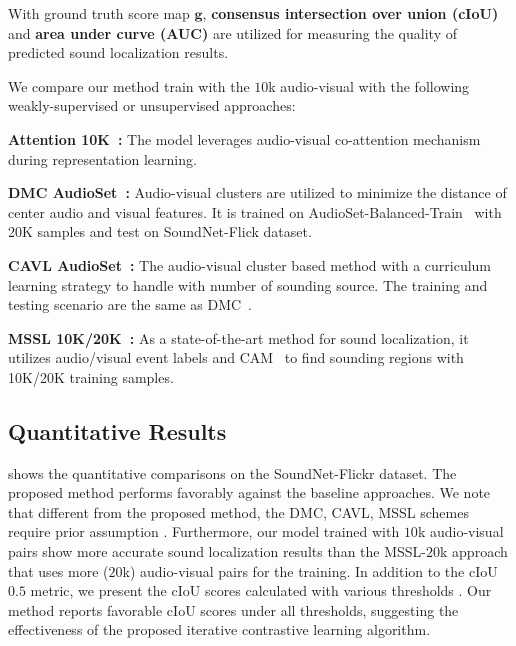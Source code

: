 With ground truth score map $\mathbf{g}$, 
\textbf{consensus intersection over union (cIoU)} and \textbf{area under curve (AUC)} are utilized for measuring the quality of predicted sound localization results. 

We compare our method train with the $10$k audio-visual with the following weakly-supervised or unsupervised approaches: 
\begin{compactitem}
\item\textbf{Attention 10K~\cite{av_cvpr18_lls,av_tpami20_lls}:} The model leverages audio-visual co-attention mechanism during representation learning.

\item \textbf{DMC AudioSet~\cite{av_cvpr19_deep_cluster}:} Audio-visual clusters are utilized to minimize the distance of center audio and visual features. It is trained on AudioSet-Balanced-Train~\cite{Audioset} with 20K samples and test on SoundNet-Flick dataset.

\item \textbf{CAVL AudioSet~\cite{av_arxiv_curricumlum_av_clutser}:} 
The audio-visual cluster based method with a curriculum learning strategy to handle with number of sounding source. The training and testing scenario are the same as DMC~\cite{av_cvpr19_deep_cluster}. 
\item \textbf{MSSL 10K/20K~\cite{av_eccv20_mms_loc}:} As a state-of-the-art method for sound localization, it utilizes audio/visual event labels and CAM~\cite{cvpr16_CAM} to find sounding regions with 10K/20K training samples.

\end{compactitem}




\subsection{Quantitative Results}
% 
 shows the quantitative comparisons on the SoundNet-Flickr dataset.
% 
The proposed method performs favorably against the baseline approaches.
%
We note that different from the proposed method, the DMC, CAVL, MSSL schemes require prior assumption .
%
Furthermore, our model trained with $10$k audio-visual pairs show more accurate sound localization results than the MSSL-$20$k approach that uses more (\ie $20$k) audio-visual pairs for the training.
%
In addition to the cIoU\@$0.5$ metric, we present the cIoU scores calculated with various thresholds .
%
Our method reports favorable cIoU scores under all thresholds, suggesting the effectiveness of the proposed iterative contrastive learning algorithm.


